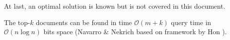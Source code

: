 \begin{figure}[htb]
  \centering
  
  \caption{}
  \label{fig:singleTermFrequencySuffixTree}
\end{figure}

At last, an optimal solution is known but is not covered in this document.

\begin{Theorem}
  The top-$k$ documents can be found in time $\mathcal{O}(m + k)$ query time in $\mathcal{O}(n \log n)$ bits space (Navarro \& Nekrich \cite{Navarro2012} based on framework by Hon \cite{Hon2014}).
\end{Theorem}
